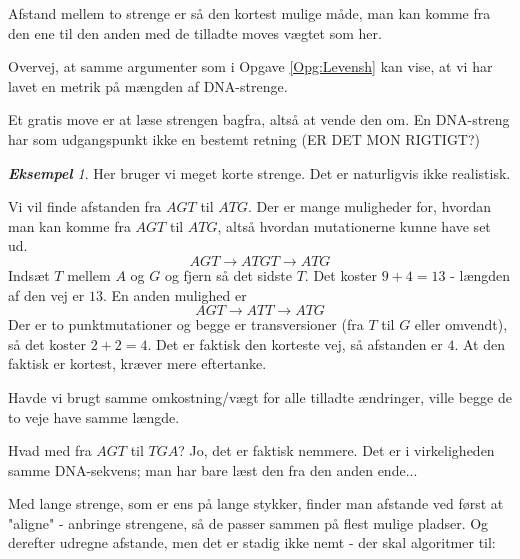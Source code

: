 \documentclass[a4paper, 12pt]{article}
\theoremstyle{remark}
\newtheorem{Eksempel}{\textbf{Eksempel}}
\begin{document}
Afstand mellem to strenge er så den kortest mulige måde, man kan komme fra den ene til den anden med de tilladte moves vægtet som her. 

Overvej, at samme argumenter som i Opgave \ref{Opg:Levensh} kan vise, at vi har lavet en metrik på mængden af DNA-strenge.

Et gratis move er at læse strengen bagfra, altså at vende den om. En DNA-streng har som udgangspunkt ikke en bestemt retning (ER DET MON RIGTIGT?)

\begin{Eksempel} 
Her bruger vi meget korte strenge. Det er naturligvis ikke realistisk. 

Vi vil finde afstanden fra $AGT$ til $ATG$. Der er mange muligheder for, hvordan man kan komme fra $AGT$ til $ATG$, altså hvordan mutationerne kunne have set ud. 
$$ AGT \to ATGT \to ATG$$
Indsæt $T$ mellem $A$ og $G$ og fjern så det sidste $T$. Det koster $9+4 =13$ - længden af den vej er $13$. En anden mulighed er 
$$AGT\to ATT \to ATG$$
Der er to punktmutationer og begge er transversioner (fra $T$ til $G$ eller omvendt), så det koster $2+2=4$. Det er faktisk den korteste vej, så afstanden er $4$. At den faktisk er kortest, kræver mere eftertanke. 

Havde vi brugt samme omkostning/vægt for alle tilladte ændringer, ville begge de to veje have samme længde. 

Hvad med fra $AGT$ til $TGA$? Jo, det er faktisk nemmere. Det er i virkeligheden samme DNA-sekvens; man har bare læst den fra den anden ende... 

\end{Eksempel}
Med lange strenge, som er ens på lange stykker, finder man afstande ved først at "aligne"\; - anbringe strengene, så de passer sammen på flest mulige pladser. Og derefter udregne afstande, men det er stadig ikke nemt - der skal algoritmer til:
\end{document}
